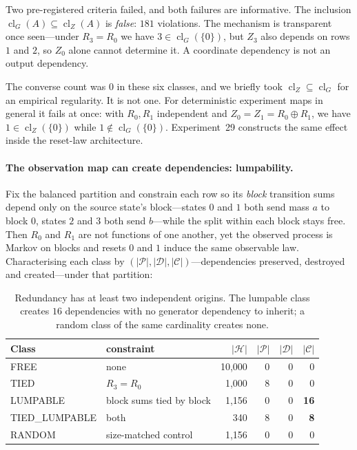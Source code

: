 \documentclass[11pt]{article}
\newcommand{\HH}{\ensuremath{\mathcal{H}}}
\begin{document}
Two pre-registered criteria failed, and both failures are informative. The inclusion
$\operatorname{cl}_G(A) \subseteq \operatorname{cl}_Z(A)$ is \emph{false}: $181$
violations. The mechanism is transparent once seen---under $R_3 = R_0$ we have
$3 \in \operatorname{cl}_G(\{0\})$, but $Z_3$ also depends on rows $1$ and $2$, so $Z_0$
alone cannot determine it. A coordinate dependency is not an output dependency.

The converse count was $0$ in these six classes, and we briefly took
$\operatorname{cl}_Z \subseteq \operatorname{cl}_G$ for an empirical regularity. It is
not one. For deterministic experiment maps in general it fails at once: with $R_0, R_1$
independent and $Z_0 = Z_1 = R_0 \oplus R_1$, we have $1 \in \operatorname{cl}_Z(\{0\})$
while $1 \notin \operatorname{cl}_G(\{0\})$. Experiment~29 constructs the same effect
inside the reset-law architecture.

\paragraph{The observation map can create dependencies: lumpability.}
Fix the balanced partition and constrain each row so its \emph{block} transition sums
depend only on the source state's block---states $0$ and $1$ both send mass $a$ to block
$0$, states $2$ and $3$ both send $b$---while the split within each block stays free. Then
$R_0$ and $R_1$ are not functions of one another, yet the observed process is Markov on
blocks and resets $0$ and $1$ induce the same observable law. Characterising each class by
$(|\mathcal{P}|, |\mathcal{D}|, |\mathcal{C}|)$---dependencies preserved, destroyed and
created---under that partition:

\begin{table}[h]
\centering
\begin{tabular}{llrrrr}
\toprule
Class & constraint & $|\HH|$ & $|\mathcal{P}|$ & $|\mathcal{D}|$ & $|\mathcal{C}|$ \\
\midrule
FREE          & none                        & 10{,}000 & 0 & 0 & 0 \\
TIED          & $R_3 = R_0$                 & 1{,}000  & 8 & 0 & 0 \\
LUMPABLE      & block sums tied by block    & 1{,}156  & 0 & 0 & \textbf{16} \\
TIED\_LUMPABLE & both                       & 340      & 8 & 0 & \textbf{8} \\
RANDOM        & size-matched control        & 1{,}156  & 0 & 0 & 0 \\
\bottomrule
\end{tabular}
\caption{Redundancy has at least two independent origins. The lumpable class creates $16$
dependencies with no generator dependency to inherit; a random class of the same
cardinality creates none.}
\label{tab:pdc}
\end{table}
\end{document}
